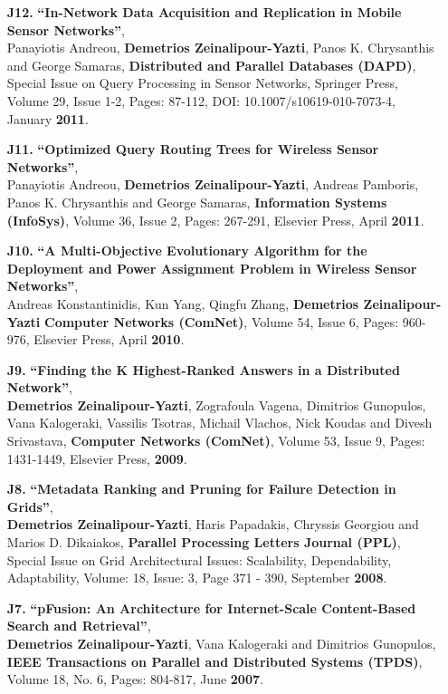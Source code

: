 \documentclass[10pt]{article}
\begin{document}
\begin{enumerate}
\item[{\bf J12.}] 
\label{J12}
{\bf ``In-Network Data Acquisition and Replication in Mobile Sensor Networks''},\\
Panayiotis Andreou, {\bf Demetrios Zeinalipour-Yazti}, Panos K. Chrysanthis and George Samaras,
{\bf Distributed and Parallel Databases (DAPD)}, Special Issue on Query Processing in Sensor Networks, 
Springer Press,  Volume 29, Issue 1-2, Pages: 87-112, DOI: 10.1007/s10619-010-7073-4, January {\bf 2011}.

\item[{\bf J11.}] 
\label{J11}
{\bf ``Optimized Query Routing Trees for Wireless Sensor Networks''},\\
Panayiotis Andreou, {\bf Demetrios Zeinalipour-Yazti}, Andreas Pamboris, Panos K. Chrysanthis and George Samaras,
{\bf Information Systems (InfoSys)}, Volume 36, Issue 2, Pages: 267-291, Elsevier Press, April {\bf 2011}.

\item[{\bf J10.}] 
\label{J10}
{\bf ``A Multi-Objective Evolutionary Algorithm for the Deployment and Power Assignment Problem in Wireless Sensor Networks''}, \\
Andreas Konstantinidis, Kun Yang, Qingfu Zhang, {\bf Demetrios Zeinalipour-Yazti}
{\bf Computer Networks (ComNet)}, Volume 54, Issue 6, Pages: 960-976, Elsevier Press, April {\bf 2010}.

\item[{\bf J9.}] 
\label{J9}
{\bf ``Finding the K Highest-Ranked Answers in a Distributed Network''},\\
{\bf Demetrios Zeinalipour-Yazti}, Zografoula Vagena, Dimitrios Gunopulos, Vana Kalogeraki, Vassilis Tsotras, Michail Vlachos, Nick Koudas and Divesh Srivastava,
{\bf Computer Networks (ComNet)},  Volume 53, Issue 9, Pages: 1431-1449, Elsevier Press, {\bf 2009}.

\item[{\bf J8.}] 
\label{J8}
{\bf ``Metadata Ranking and Pruning for Failure Detection in Grids''},\\
{\bf Demetrios Zeinalipour-Yazti}, Haris Papadakis, Chryssis Georgiou and Marios D. Dikaiakos,
{\bf Parallel Processing Letters Journal (PPL)}, 
Special Issue on Grid Architectural Issues: Scalability, Dependability, Adaptability,
Volume:  18, Issue: 3, Page 371 - 390, September {\bf 2008}.

\item[{\bf J7.}] 
\label{J7}
{\bf ``pFusion: An Architecture for Internet-Scale Content-Based Search and Retrieval''},\\
{\bf Demetrios Zeinalipour-Yazti}, Vana Kalogeraki and Dimitrios Gunopulos,
{\bf IEEE Transactions on Parallel and Distributed Systems (TPDS)}, Volume 18, No. 6, Pages: 804-817, June {\bf 2007}.


\end{enumerate}
\end{document}
